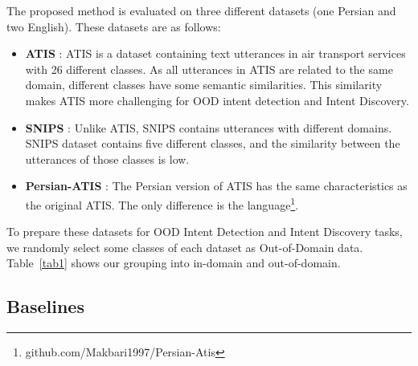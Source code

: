 \documentclass{article}
\begin{document}
\noindent The proposed method is evaluated on three different datasets (one Persian and two English).
These datasets are as follows:
\begin{itemize}
  \item \textbf{ATIS} \cite{hemphill-etal-1990-atis}: ATIS is a dataset containing text utterances in air transport services with 26 different classes. As all utterances in ATIS are related to the same domain, different classes have some semantic similarities. This similarity makes ATIS more challenging for OOD intent detection and Intent Discovery.
  \item \textbf{SNIPS} \cite{coucke2018snips}: Unlike ATIS, SNIPS contains utterances with different domains. SNIPS dataset contains five different classes, and the similarity between the utterances of those classes is low.
  \item \textbf{Persian-ATIS} \cite{akbari2023persian}: The Persian version of ATIS has the same characteristics as the original ATIS. The only difference is the language\footnote{github.com/Makbari1997/Persian-Atis}.
\end{itemize}

To prepare these datasets for OOD Intent Detection and Intent Discovery tasks,
we randomly select some classes of each dataset as Out-of-Domain data.
Table~\ref{tab1} shows our grouping into in-domain and out-of-domain.

\subsection{Baselines}
\end{document}
